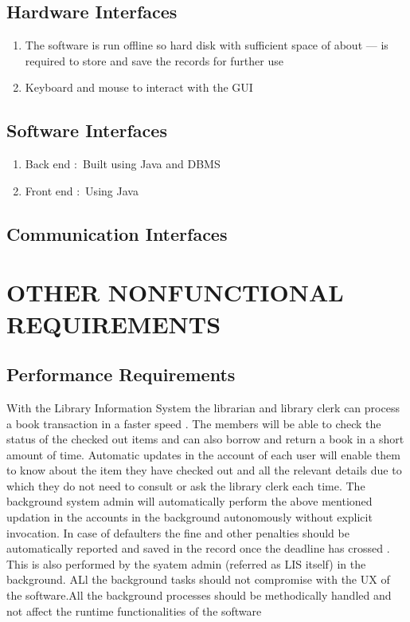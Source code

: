\documentclass{article}
\begin{document}
\subsection{Hardware Interfaces}
\begin{enumerate}
\item The software is run offline so hard disk with sufficient space of about --- is required to store and save the records for further use
\item Keyboard and mouse to interact with the GUI
\end{enumerate}
\subsection{Software Interfaces}
\begin{enumerate}
\item Back end  $:$ Built using Java and DBMS
\item Front end $:$ Using Java 
\end{enumerate}

\subsection{Communication Interfaces}

\section{OTHER NONFUNCTIONAL REQUIREMENTS}
\subsection{Performance Requirements}
With the Library Information System the librarian and library clerk can process a book transaction in a faster speed .
The members will be able to check the status of the checked out items and can also borrow and return a book in a short amount of time.
Automatic updates in the account of each user will enable them to know about the item they have checked out and all the relevant details due to which they do not need to consult or ask the library clerk each time.
The background system admin will automatically perform the above mentioned updation in the accounts in the background autonomously without explicit invocation.
In case of defaulters the fine and other penalties should be automatically reported and saved in the record once the deadline has crossed . This is also performed by the syatem admin (referred as LIS itself) in the background.
ALl the background tasks should not compromise with the UX of the software.All the background processes should be methodically handled and not affect the runtime functionalities of the software
\end{document}
